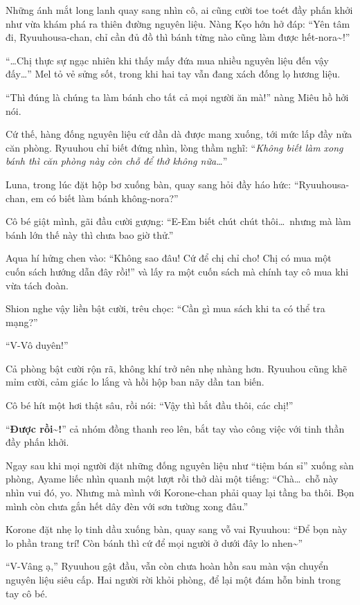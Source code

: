 \documentclass[../main.tex]{subfiles}
\begin{document}
Những ánh mắt long lanh quay sang nhìn cô, ai cũng cười toe toét đầy phấn khởi như vừa khám phá ra thiên đường nguyên liệu. Nàng Kẹo hớn hở đáp: ``Yên tâm đi, Ryuuhousa-chan, chỉ cần đủ đồ thì bánh từng nào cũng làm được hết-nora\~{}!''

``\dots Chị thực sự ngạc nhiên khi thấy mấy đứa mua nhiều nguyên liệu đến vậy đấy\dots'' Mel tỏ vẻ sửng sốt, trong khi hai tay vẫn đang xách đống lọ hương liệu.

``Thì đúng là chúng ta làm bánh cho tất cả mọi người ăn mà!'' nàng Miêu hồ hởi nói.

Cứ thế, hàng đống nguyên liệu cứ dần dà được mang xuống, tới mức lấp đầy nửa căn phòng. Ryuuhou chỉ biết đứng nhìn, lòng thầm nghĩ: ``\textit{Không biết làm xong bánh thì căn phòng này còn chỗ để thở không nữa\dots}''

Luna, trong lúc đặt hộp bơ xuống bàn, quay sang hỏi đầy háo hức: ``Ryuuhousa-chan, em có biết làm bánh không-nora?''

Cô bé giật mình, gãi đầu cười gượng: ``E-Em biết chút chút thôi\dots\ nhưng mà làm bánh lớn thế này thì chưa bao giờ thử.''

Aqua hí hửng chen vào: ``Không sao đâu! Cứ để chị chỉ cho! Chị có mua một cuốn sách hướng dẫn đây rồi!'' và lấy ra một cuốn sách mà chính tay cô mua khi vừa tách đoàn.

Shion nghe vậy liền bật cười, trêu chọc: ``Cần gì mua sách khi ta có thể tra mạng?''

``V-Vô duyên!''

Cả phòng bật cười rộn rã, không khí trở nên nhẹ nhàng hơn. Ryuuhou cũng khẽ mỉm cười, cảm giác lo lắng và hồi hộp ban nãy dần tan biến.

Cô bé hít một hơi thật sâu, rồi nói: ``Vậy thì bắt đầu thôi, các chị!''

``\textbf{Được rồi\~{}!}'' cả nhóm đồng thanh reo lên, bắt tay vào công việc với tinh thần đầy phấn khởi.

\ct

Ngay sau khi mọi người đặt những đống nguyên liệu như ``tiệm bán sỉ'' xuống sàn phòng, Ayame liếc nhìn quanh một lượt rồi thở dài một tiếng: ``Chà\dots\ chỗ này nhìn vui đó, yo. Nhưng mà mình với Korone-chan phải quay lại tầng ba thôi. Bọn mình còn chưa gắn hết dây đèn với sơn tường xong đâu.''

Korone đặt nhẹ lọ tinh dầu xuống bàn, quay sang vỗ vai Ryuuhou: ``Để bọn này lo phần trang trí! Còn bánh thì cứ để mọi người ở dưới đây lo nhen\~{}''

``V-Vâng ạ,'' Ryuuhou gật đầu, vẫn còn chưa hoàn hồn sau màn vận chuyển nguyên liệu siêu cấp. Hai người rời khỏi phòng, để lại một đám hỗn binh trong tay cô bé.
\end{document}
